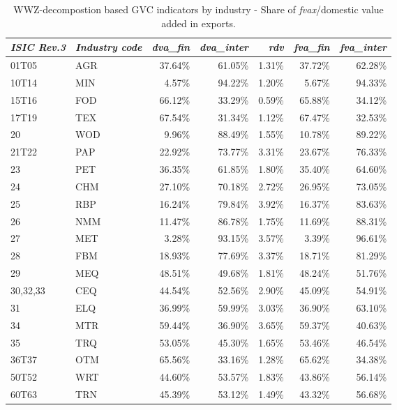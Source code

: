 \documentclass[a4paper,11pt]{article}
\begin{document}
\begin{table}[h]\small
  \centering
       \caption{WWZ-decompostion based GVC indicators by industry - Share of \emph{fvax}/domestic value added in exports.}
    \begin{tabular}{llrrrrr}
    \toprule
    \textit{ISIC Rev.3} & \textit{Industry code} & \textit{dva\_fin} & \textit{dva\_inter} & \textit{rdv} & \textit{fva\_fin} & \textit{fva\_inter} \\
    \midrule
     01T05 & AGR   & 37.64\% & 61.05\% & 1.31\% & 37.72\% & 62.28\% \\
    10T14 & MIN   & 4.57\% & 94.22\% & 1.20\% & 5.67\% & 94.33\% \\
    15T16 & FOD   & 66.12\% & 33.29\% & 0.59\% & 65.88\% & 34.12\% \\
    17T19 & TEX   & 67.54\% & 31.34\% & 1.12\% & 67.47\% & 32.53\% \\
    20    & WOD   & 9.96\% & 88.49\% & 1.55\% & 10.78\% & 89.22\% \\
    21T22 & PAP   & 22.92\% & 73.77\% & 3.31\% & 23.67\% & 76.33\% \\
    23    & PET   & 36.35\% & 61.85\% & 1.80\% & 35.40\% & 64.60\% \\
    24    & CHM   & 27.10\% & 70.18\% & 2.72\% & 26.95\% & 73.05\% \\
    25    & RBP   & 16.24\% & 79.84\% & 3.92\% & 16.37\% & 83.63\% \\
    26    & NMM   & 11.47\% & 86.78\% & 1.75\% & 11.69\% & 88.31\% \\
    27    & MET   & 3.28\% & 93.15\% & 3.57\% & 3.39\% & 96.61\% \\
    28    & FBM   & 18.93\% & 77.69\% & 3.37\% & 18.71\% & 81.29\% \\
    29    & MEQ   & 48.51\% & 49.68\% & 1.81\% & 48.24\% & 51.76\% \\
    30,32,33 & CEQ   & 44.54\% & 52.56\% & 2.90\% & 45.09\% & 54.91\% \\
    31    & ELQ   & 36.99\% & 59.99\% & 3.03\% & 36.90\% & 63.10\% \\
    34    & MTR   & 59.44\% & 36.90\% & 3.65\% & 59.37\% & 40.63\% \\
    35    & TRQ   & 53.05\% & 45.30\% & 1.65\% & 53.46\% & 46.54\% \\
    36T37 & OTM   & 65.56\% & 33.16\% & 1.28\% & 65.62\% & 34.38\% \\
    50T52 & WRT   & 44.60\% & 53.57\% & 1.83\% & 43.86\% & 56.14\% \\
    60T63 & TRN   & 45.39\% & 53.12\% & 1.49\% & 43.32\% & 56.68\% \\

\end{tabular}
\end{table}
\end{document}
